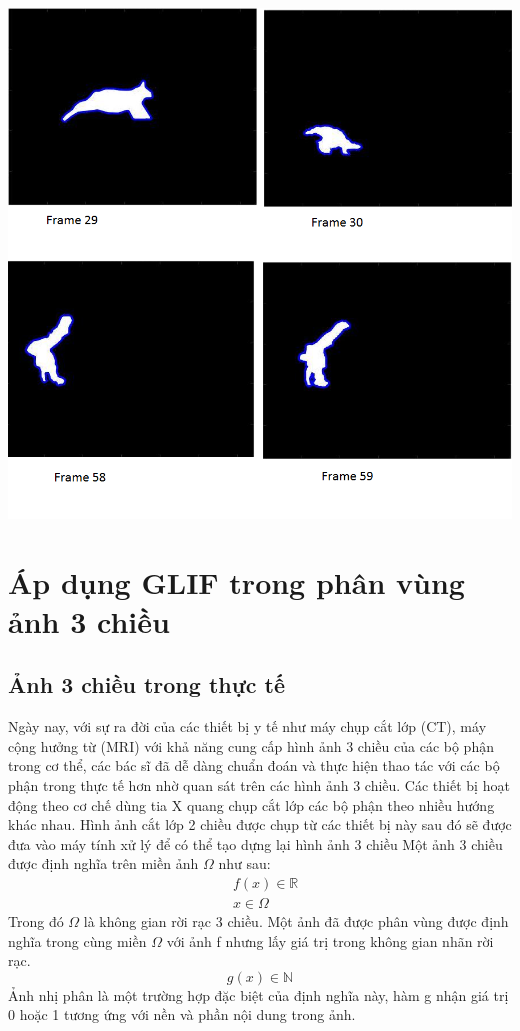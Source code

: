 \documentclass[14pt,oneside,a4paper]{extreport}
\begin{document}
\begin{center}
\includegraphics[scale=0.5]{figure/animals.png}
\end{center}
\chapter{Áp dụng GLIF trong phân vùng ảnh 3 chiều}
\section{Ảnh 3 chiều trong thực tế}
Ngày nay, với sự ra đời của các thiết bị y tế  như máy chụp cắt lớp (CT), máy cộng hưởng từ (MRI) với khả năng cung cấp hình ảnh 3 chiều của các bộ phận trong cơ thể, các bác sĩ đã dễ dàng chuẩn đoán và thực hiện thao tác với các bộ phận trong thực tế hơn nhờ quan sát trên các hình ảnh  3 chiều. Các thiết bị hoạt động theo cơ chế dùng tia X quang chụp cắt lớp các bộ phận theo nhiều hướng khác nhau. Hình ảnh cắt lớp 2 chiều được chụp từ các thiết bị này sau đó sẽ được đưa vào máy tính xử lý để có thể tạo dựng lại hình ảnh 3 chiều 
Một ảnh 3 chiều được định nghĩa trên miền ảnh $\Omega$ như sau: 
\begin{equation}
\begin{split}
&f(x)\in \mathbb{R}\\
&x\in \Omega
\end{split}
\end{equation} 
Trong đó $\Omega$ là không gian rời rạc 3 chiều. Một ảnh đã được phân vùng được định nghĩa trong cùng miền $\Omega$ với ảnh f nhưng lấy giá trị trong không gian nhãn rời rạc. 
\begin{equation}
g(x)\in \mathbb{N}
\end{equation}
Ảnh nhị phân là một trường hợp đặc biệt của định nghĩa này, hàm g nhận giá trị 0 hoặc 1 tương ứng với nền và phần nội dung trong ảnh. 
\end{document}
